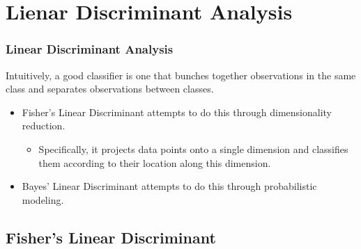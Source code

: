 \documentclass[aspectratio = 169]{beamer}
\begin{document}




\section{Lienar Discriminant Analysis}

\begin{frame}

\frametitle{Linear Discriminant Analysis}

Intuitively, a good classifier is one that bunches together observations in the same class and separates observations between classes.

\vspace{0.4cm}


\begin{itemize}

	\item Fisher's Linear Discriminant attempts to do this through dimensionality reduction.


	\begin{itemize}

		\item Specifically, it projects data points onto a single dimension and classifies them according to their location along this dimension.

	\end{itemize}


	\item Bayes' Linear Discriminant attempts to do this through probabilistic modeling.

\end{itemize}

\end{frame}

\subsection{Fisher's Linear Discriminant}
\end{document}

